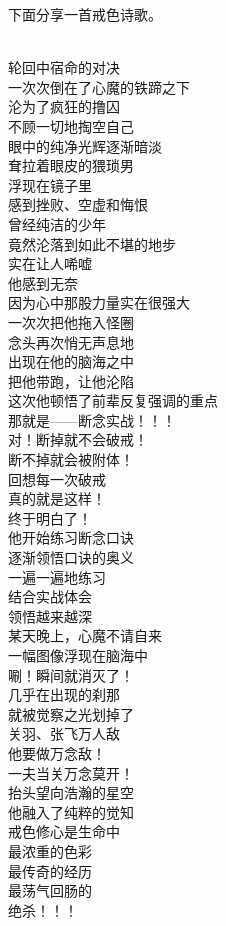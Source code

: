 下面分享一首戒色诗歌。

\begin{poem}[万念敌]
    \begin{multicols}{2}
        \begin{center}~\\
            轮回中宿命的对决 \\ 一次次倒在了心魔的铁蹄之下 \\ 沦为了疯狂的撸囚 \\ 不顾一切地掏空自己 \\ 眼中的纯净光辉逐渐暗淡 \\ 耷拉着眼皮的猥琐男 \\ 浮现在镜子里 \\ 感到挫败、空虚和悔恨 \\ 曾经纯洁的少年 \\ 竟然沦落到如此不堪的地步 \\ 实在让人唏嘘 \\ 他感到无奈 \\ 因为心中那股力量实在很强大 \\ 一次次把他拖入怪圈 \\ 念头再次悄无声息地 \\ 出现在他的脑海之中 \\ 把他带跑，让他沦陷 \\ 这次他顿悟了前辈反复强调的重点 \\ 那就是——断念实战！！！ \\ 对！断掉就不会破戒！ \\ 断不掉就会被附体！ \\ 回想每一次破戒 \\ 真的就是这样！ \\ 终于明白了！ \\ 他开始练习断念口诀 \\ 逐渐领悟口诀的奥义 \\ 一遍一遍地练习 \\ 结合实战体会 \\ 领悟越来越深 \\ 某天晚上，心魔不请自来 \\ 一幅图像浮现在脑海中 \\ 唰！瞬间就消灭了！ \\ 几乎在出现的刹那 \\ 就被觉察之光划掉了 \\ 关羽、张飞万人敌 \\ 他要做万念敌！ \\ 一夫当关万念莫开！ \\ 抬头望向浩瀚的星空 \\ 他融入了纯粹的觉知 \\ 戒色修心是生命中 \\ 最浓重的色彩 \\ 最传奇的经历 \\ 最荡气回肠的 \\ 绝杀！！！
        \end{center}
    \end{multicols}
\end{poem}

